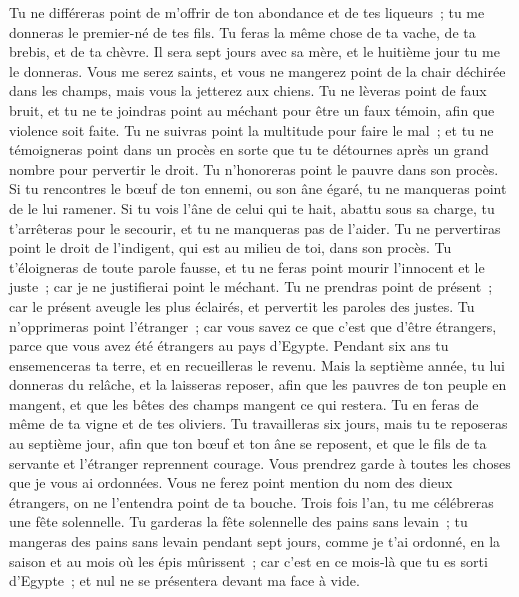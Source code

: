 \begin{multicols}{2}
Tu ne différeras point de m'offrir de ton abondance et de tes liqueurs~; tu me donneras le premier-né de tes fils.
Tu feras la même chose de ta vache, de ta brebis, et de ta chèvre. Il sera sept jours avec sa mère, et le huitième jour tu me le donneras.
Vous me serez saints, et vous ne mangerez point de la chair déchirée dans les champs, mais vous la jetterez aux chiens.
\VerseOne{}Tu ne lèveras point de faux bruit, et tu ne te joindras point au méchant pour être un faux témoin, afin que violence soit faite.
Tu ne suivras point la multitude pour faire le mal~; et tu ne témoigneras point dans un procès en sorte que tu te détournes après un grand nombre pour pervertir le droit.
Tu n'honoreras point le pauvre dans son procès.
Si tu rencontres le bœuf de ton ennemi, ou son âne égaré, tu ne manqueras point de le lui ramener.
Si tu vois l'âne de celui qui te hait, abattu sous sa charge, tu t'arrêteras pour le secourir, et tu ne manqueras pas de l'aider.
Tu ne pervertiras point le droit de l'indigent, qui est au milieu de toi, dans son procès.
Tu t'éloigneras de toute parole fausse, et tu ne feras point mourir l'innocent et le juste~; car je ne justifierai point le méchant.
Tu ne prendras point de présent~; car le présent aveugle les plus éclairés, et pervertit les paroles des justes.
Tu n'opprimeras point l'étranger~; car vous savez ce que c'est que d'être étrangers, parce que vous avez été étrangers au pays d'Egypte.
Pendant six ans tu ensemenceras ta terre, et en recueilleras le revenu.
Mais la septième année, tu lui donneras du relâche, et la laisseras reposer, afin que les pauvres de ton peuple en mangent, et que les bêtes des champs mangent ce qui restera. Tu en feras de même de ta vigne et de tes oliviers.
Tu travailleras six jours, mais tu te reposeras au septième jour, afin que ton bœuf et ton âne se reposent, et que le fils de ta servante et l'étranger reprennent courage.
Vous prendrez garde à toutes les choses que je vous ai ordonnées. Vous ne ferez point mention du nom des dieux étrangers, on ne l'entendra point de ta bouche.
Trois fois l'an, tu me célébreras une fête solennelle.
Tu garderas la fête solennelle des pains sans levain~; tu mangeras des pains sans levain pendant sept jours, comme je t'ai ordonné, en la saison et au mois où les épis mûrissent~; car c'est en ce mois-là que tu es sorti d'Egypte~; et nul ne se présentera devant ma face à vide.

\end{multicols}
